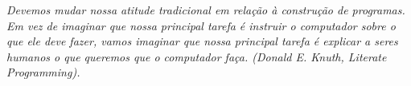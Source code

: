 
\renewcommand{\epigraphname}{EPÍGRAFE}

\begin{epigrafe}

\textit{Devemos mudar nossa atitude tradicional em relação à construção de programas. Em vez de imaginar que nossa principal tarefa é instruir o computador sobre o que ele deve fazer, vamos imaginar que nossa principal tarefa é explicar a seres humanos o que queremos que o computador faça. (Donald E. Knuth, Literate Programming).}

\end{epigrafe}



